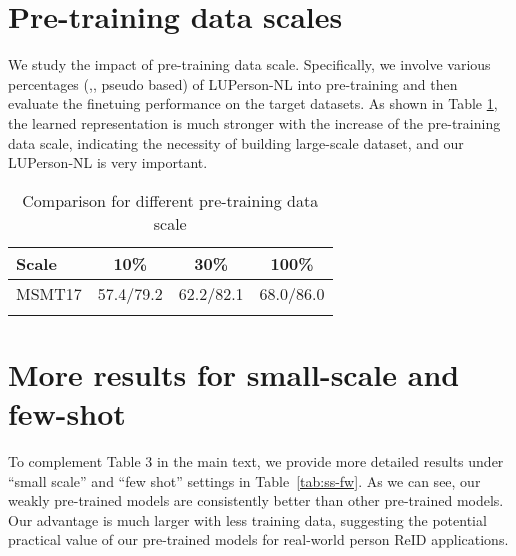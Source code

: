 \documentclass[10pt,twocolumn,letterpaper]{article}
\newcommand{\Tref}[1]{Table~\ref{#1}}
\begin{document}
\section{Pre-training data scales}

We study the impact of pre-training data scale. Specifically, we involve various percentages (,, pseudo based) of LUPerson-NL into pre-training and then evaluate the finetuing performance on the target datasets. As shown in Table \ref{tab:data-scale}, the learned representation is much stronger with the increase of the pre-training data scale, indicating the necessity of building large-scale dataset, and our LUPerson-NL is very important.

\begin{table}[t]
	\setlength{\tabcolsep}{3.4mm}
	\centering
	\begin{tabular}{l|c|c|c}
		\shline
		Scale & 10\% & 30\% & 100\% \\
		\hline
		MSMT17 & 57.4/79.2 & 62.2/82.1 & 68.0/86.0 \\
		\shline
	\end{tabular}
	\caption{Comparison for different pre-training data scale}
	\label{tab:data-scale}
\end{table}


\section{More results for small-scale and few-shot}
To complement Table 3 in the main text, we provide more detailed results under ``small scale'' and ``few shot'' settings in \Tref{tab:ss-fw}. As we can see, our weakly pre-trained models are consistently better than other pre-trained models. Our advantage is much larger with less training data, suggesting the potential practical value of our pre-trained models for real-world person ReID applications.
\end{document}
